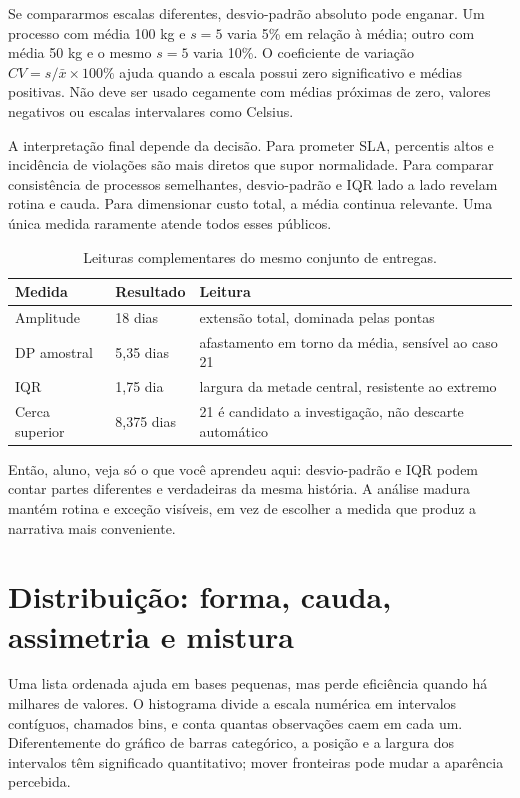 Se compararmos escalas diferentes, desvio-padrão absoluto pode enganar. Um processo com média 100 kg e $s=5$ varia 5\% em relação à média; outro com média 50 kg e o mesmo $s=5$ varia 10\%. O coeficiente de variação $CV=s/\bar{x}\times100\%$ ajuda quando a escala possui zero significativo e médias positivas. Não deve ser usado cegamente com médias próximas de zero, valores negativos ou escalas intervalares como Celsius.

A interpretação final depende da decisão. Para prometer SLA, percentis altos e incidência de violações são mais diretos que supor normalidade. Para comparar consistência de processos semelhantes, desvio-padrão e IQR lado a lado revelam rotina e cauda. Para dimensionar custo total, a média continua relevante. Uma única medida raramente atende todos esses públicos.

\begin{table}[htbp]
\centering
\small
\caption{Leituras complementares do mesmo conjunto de entregas.}
\label{tab:dispersoes-entrega}
\begin{tabularx}{0.94\textwidth}{@{}p{2.6cm}p{2.4cm}Y@{}}
\toprule
\textbf{Medida} & \textbf{Resultado} & \textbf{Leitura} \\
\midrule
Amplitude & 18 dias & extensão total, dominada pelas pontas \\
DP amostral & 5,35 dias & afastamento em torno da média, sensível ao caso 21 \\
IQR & 1,75 dia & largura da metade central, resistente ao extremo \\
Cerca superior & 8,375 dias & 21 é candidato a investigação, não descarte automático \\
\bottomrule
\end{tabularx}
\end{table}

\begin{SummaryBox}
Então, aluno, veja só o que você aprendeu aqui: desvio-padrão e IQR podem contar partes diferentes e verdadeiras da mesma história. A análise madura mantém rotina e exceção visíveis, em vez de escolher a medida que produz a narrativa mais conveniente.
\end{SummaryBox}

\section{Distribuição: forma, cauda, assimetria e mistura}

Uma lista ordenada ajuda em bases pequenas, mas perde eficiência quando há milhares de valores. O histograma divide a escala numérica em intervalos contíguos, chamados bins, e conta quantas observações caem em cada um. Diferentemente do gráfico de barras categórico, a posição e a largura dos intervalos têm significado quantitativo; mover fronteiras pode mudar a aparência percebida.

